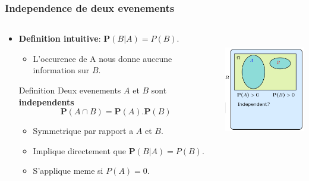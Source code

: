 \documentclass{beamer}
\begin{document}
\begin{frame}[<+->]
  \frametitle{Independence de deux evenements}

  \begin{columns}
    \begin{column}{0.6\textwidth}
      \begin{itemize}
        \scriptsize
        \item \textbf{Definition intuitive}: $\mathbf{P}(B|A) = P(B)$.
          \begin{itemize}
            \tiny
            \item L'occurence de A nous donne auccune information sur $B$.
          \end{itemize}
        \pause 
          \begin{block}{Definition}
            \scriptsize
            Deux evenements $A$ et $B$ sont \alert{\textbf{independents}} 
            $$
            \mathbf{P}(A\cap B) = \mathbf{P}(A).\mathbf{P}(B)
            $$
          \end{block}
      \begin{itemize}
        \scriptsize
        \item Symmetrique par rapport a $A$ et $B$.\\[8pt]
        \item  Implique directement que  $\mathbf{P}(B|A) = P(B)$.\\[8pt]
        \item S'applique meme si $P(A) = 0$.
      \end{itemize}
            
      \end{itemize}
      
    \end{column}
    \begin{column}{0.4\textwidth}
        \centering
        \includegraphics[width=4cm,height=5cm]{test_independence.png}
    \end{column}
  \end{columns}
\end{frame}
\end{document}
